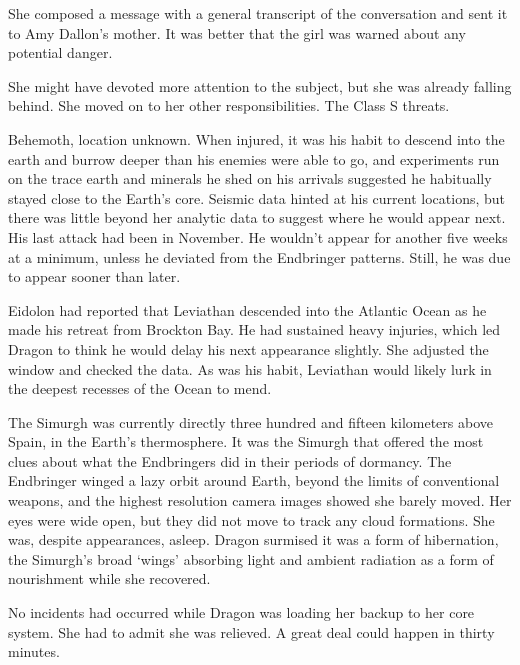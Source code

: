 She composed a message with a general transcript of the conversation and sent it to Amy Dallon's mother.  It was better that the girl was warned about any potential danger.



She might have devoted more attention to the subject, but she was already falling behind.  She moved on to her other responsibilities.  The Class S threats.



Behemoth, location unknown.  When injured, it was his habit to descend into the earth and burrow deeper than his enemies were able to go, and experiments run on the trace earth and minerals he shed on his arrivals suggested he habitually stayed close to the Earth's core.   Seismic data hinted at his current locations, but there was little beyond her analytic data to suggest where he would appear next.  His last attack had been in November.  He wouldn't appear for another five weeks at a minimum, unless he deviated from the Endbringer patterns.  Still, he was due to appear sooner than later.



Eidolon had reported that Leviathan descended into the Atlantic Ocean as he made his retreat from Brockton Bay.  He had sustained heavy injuries, which led Dragon to think he would delay his next appearance slightly.  She adjusted the window and checked the data.  As was his habit, Leviathan would likely lurk in the deepest recesses of the Ocean to mend.



The Simurgh was currently directly three hundred and fifteen kilometers above Spain, in the Earth's thermosphere.  It was the Simurgh that offered the most clues about what the Endbringers did in their periods of dormancy.  The Endbringer winged a lazy orbit around Earth, beyond the limits of conventional weapons, and the highest resolution camera images showed she barely moved.  Her eyes were wide open, but they did not move to track any cloud formations.  She was, despite appearances, asleep.  Dragon surmised it was a form of hibernation, the Simurgh's broad `wings' absorbing light and ambient radiation as a form of nourishment while she recovered.



No incidents had occurred while Dragon was loading her backup to her core system.  She had to admit she was relieved.  A great deal could happen in thirty minutes.



